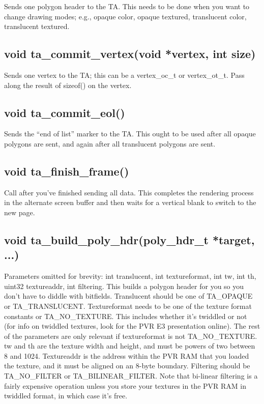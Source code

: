 \documentclass[english]{report}
\begin{document}
Sends one polygon header to the TA. This needs to be done when you
want to change drawing modes; e.g., opaque color, opaque textured,
translucent color, translucent textured.


\subsection{void ta\_commit\_vertex(void *vertex, int size)}

Sends one vertex to the TA; this can be a vertex\_oc\_t or vertex\_ot\_t.
Pass along the result of sizeof() on the vertex.


\subsection{void ta\_commit\_eol()}

Sends the ``end of list'' marker to the TA. This ought to be used
after all opaque polygons are sent, and again after all translucent
polygons are sent.


\subsection{void ta\_finish\_frame()}

Call after you've finished sending all data. This completes the rendering
process in the alternate screen buffer and then waits for a vertical
blank to switch to the new page.


\subsection{void ta\_build\_poly\_hdr(poly\_hdr\_t *target, ...)}

Parameters omitted for brevity: int translucent, int textureformat,
int tw, int th, uint32 textureaddr, int filtering. This builds a polygon
header for you so you don't have to diddle with bitfields. Translucent
should be one of TA\_OPAQUE or TA\_TRANSLUCENT. Textureformat needs
to be one of the texture format constants or TA\_NO\_TEXTURE. This
includes whether it's twiddled or not (for info on twiddled textures,
look for the PVR E3 presentation online). The rest of the parameters
are only relevant if textureformat is not TA\_NO\_TEXTURE. tw and
th are the texture width and height, and must be powers of two between
8 and 1024. Textureaddr is the address within the PVR RAM that you
loaded the texture, and it must be aligned on an 8-byte boundary.
Filtering should be TA\_NO\_FILTER or TA\_BILINEAR\_FILTER. Note that
bi-linear filtering is a fairly expensive operation unless you store
your textures in the PVR RAM in twiddled format, in which case it's
free.
\end{document}
